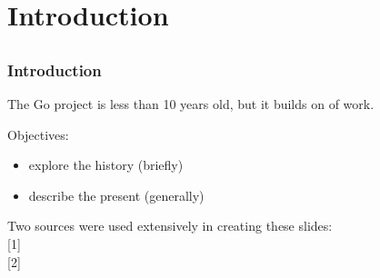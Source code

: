 \usetitlepagetemplate{
  \vbox{}
  \vfill
  \begin{centering}
    {\textcolor{macewan}{\Large{\inserttitle}}}\par
    \ifx\insertsubtitle\@empty\else\vskip0.0em\vskip0.4em{\large{\structure{\textcolor{macewan}\insertsubtitle}}}\par\fi
    \vskip2em\par
    \insertauthor\par
    \insertinstitute\par\vskip1.25em
    \inserteventshort\par\vskip1.25em
    \insertdate\par
  \end{centering}
  \vfill
}



\frame[plain,c]{
  \titlepage
}


\section{Introduction}
\subsection*{}

\begin{frame}[t]
  \frametitle{Introduction}

  The Go project is less than 10 years old, but it builds on  of work.

  \vspace{\baselineskip}
  Objectives:
  \begin{itemize}
  \item explore the history (briefly)
  \item describe the present (generally)
  \end{itemize}

  \fullvfill
  \hfill
  \begin{minipage}{\linewidth}
    \raggedright
    \footnotesize
    Two sources were used extensively in creating these slides:\\
    \hangindent=5mm [1]~\\
    \hangindent=5mm [2]~
  \end{minipage}
\end{frame}

